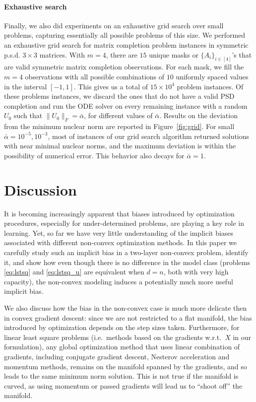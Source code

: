 \paragraph*{Exhaustive search} Finally, we also did experiments on an exhaustive grid search over small problems, capturing essentially all possible problems of this size. We performed an exhaustive grid search for matrix completion problem instances in symmetric p.s.d. ${3\times 3}$ matrices.  With $m=4$, there are $15$ unique masks or $\{A_i\}_{i\in[4]}$'s that are valid symmetric matrix completion observations. For each mask, we fill the $m=4$ observations with all possible combinations of $10$ uniformly spaced values in the interval $[-1,1]$. This gives us a total of
$15\times 10^4$ problem instances. Of these problems instances, we discard the ones that do not have a valid PSD completion and run the ODE solver on every remaining instance with a random $U_0$ such that
$\|U_0\|_F=\bar{\alpha}$, for different values of $\bar{\alpha}$.
Results on the deviation from the minimum nuclear norm are reported in
Figure~\ref{fig:grid}.  For small $\bar{\alpha}=10^{-5}, 10^{-3}$, most of instances of our grid search algorithm returned solutions with near minimal nuclear norms, and the maximum deviation is within the possibility of numerical error. This behavior also decays for
$\bar{\alpha}=1$.

\section{Discussion}

It is becoming increasingly apparent that biases introduced by optimization procedures, especially for under-determined problems, are playing a key role in learning.  Yet, so far we have very little understanding of the implicit biases associated with different non-convex optimization methods.  In this paper we carefully study such an implicit bias in a two-layer non-convex problem, identify it, and show how even though there is no difference in the model class (problems \eqref{eq:lstsq} and \eqref{eq:lstsq_u} are equivalent when $d=n$, both with very high capacity), the non-convex modeling induces a potentially much more useful implicit bias.

We also discuss how the bias in the non-convex case is much more delicate then in convex gradient descent: since we are not restricted to a flat manifold, the bias introduced by optimization depends on the step sizes taken.  Furthermore, for linear least square problems (i.e.~methods based on the gradients w.r.t.~$X$ in our formulation), any global optimization method that uses linear combination of gradients, including conjugate gradient descent, Nesterov acceleration and momentum methods, remains on the manifold spanned by the gradients, and so leads to the same minimum norm solution.  This is not true if the manifold is curved, as using momentum or passed gradients will lead us to ``shoot off'' the manifold.

